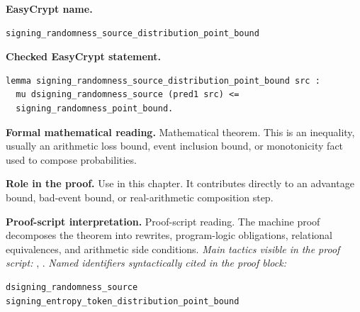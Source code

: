 \begin{formaltheorem}
\noindent\textbf{EasyCrypt name.}
\begin{lstlisting}[language=EasyCrypt,basicstyle=\ttfamily\scriptsize]
signing_randomness_source_distribution_point_bound
\end{lstlisting}
\noindent\textbf{Checked EasyCrypt statement.}
\begin{lstlisting}[language=EasyCrypt,basicstyle=\ttfamily\scriptsize]
lemma signing_randomness_source_distribution_point_bound src :
  mu dsigning_randomness_source (pred1 src) <=
  signing_randomness_point_bound.
\end{lstlisting}
\noindent\textbf{Formal mathematical reading.}
Mathematical theorem. This is an inequality, usually an arithmetic loss bound, event inclusion bound, or monotonicity fact used to compose probabilities.

\noindent\textbf{Role in the proof.}
Use in this chapter. It contributes directly to an advantage bound, bad-event bound, or real-arithmetic composition step.

\noindent\textbf{Proof-script interpretation.}
Proof-script reading. The machine proof decomposes the theorem into rewrites, program-logic obligations, relational equivalences, and arithmetic side conditions.
\emph{Main tactics visible in the proof script:} , .
\emph{Named identifiers syntactically cited in the proof block:}
\begin{lstlisting}[language=EasyCrypt,basicstyle=\ttfamily\scriptsize]
dsigning_randomness_source
signing_entropy_token_distribution_point_bound
\end{lstlisting}

\end{formaltheorem}

